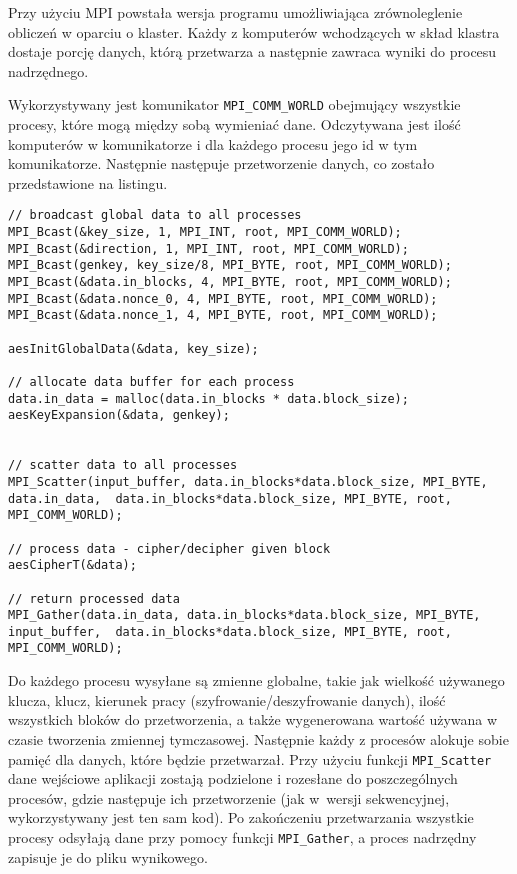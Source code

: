\documentclass[a4paper,12pt]{article}
\begin{document}
Przy użyciu MPI powstała wersja programu umożliwiająca zrównoleglenie obliczeń  
w oparciu o klaster.  Każdy z komputerów wchodzących w skład klastra dostaje 
porcję danych, którą przetwarza a następnie zawraca wyniki do procesu nadrzędnego.

Wykorzystywany jest komunikator \texttt{MPI\_COMM\_WORLD} obejmujący wszystkie procesy, które mogą między sobą wymieniać dane. Odczytywana jest ilość komputerów w komunikatorze i dla każdego procesu jego id w tym komunikatorze. Następnie następuje przetworzenie danych, co zostało przedstawione na listingu.

\begin{lstlisting}
// broadcast global data to all processes
MPI_Bcast(&key_size, 1, MPI_INT, root, MPI_COMM_WORLD);
MPI_Bcast(&direction, 1, MPI_INT, root, MPI_COMM_WORLD);
MPI_Bcast(genkey, key_size/8, MPI_BYTE, root, MPI_COMM_WORLD);
MPI_Bcast(&data.in_blocks, 4, MPI_BYTE, root, MPI_COMM_WORLD);
MPI_Bcast(&data.nonce_0, 4, MPI_BYTE, root, MPI_COMM_WORLD);
MPI_Bcast(&data.nonce_1, 4, MPI_BYTE, root, MPI_COMM_WORLD);

aesInitGlobalData(&data, key_size);

// allocate data buffer for each process
data.in_data = malloc(data.in_blocks * data.block_size);
aesKeyExpansion(&data, genkey);


// scatter data to all processes
MPI_Scatter(input_buffer, data.in_blocks*data.block_size, MPI_BYTE, data.in_data,  data.in_blocks*data.block_size, MPI_BYTE, root, MPI_COMM_WORLD);

// process data - cipher/decipher given block
aesCipherT(&data);

// return processed data
MPI_Gather(data.in_data, data.in_blocks*data.block_size, MPI_BYTE, input_buffer,  data.in_blocks*data.block_size, MPI_BYTE, root, MPI_COMM_WORLD);
\end{lstlisting}

Do każdego procesu wysyłane są zmienne globalne, takie jak wielkość używanego klucza, 
klucz, kierunek pracy (szyfrowanie/deszyfrowanie danych), ilość wszystkich bloków 
do przetworzenia, a także wygenerowana wartość używana w czasie tworzenia zmiennej tymczasowej.
Następnie każdy z procesów alokuje sobie pamięć dla danych, które będzie przetwarzał. 
Przy użyciu funkcji \texttt{MPI\_Scatter} dane wejściowe aplikacji zostają podzielone 
i rozesłane do poszczególnych procesów, gdzie następuje ich przetworzenie (jak 
w~wersji sekwencyjnej, wykorzystywany jest ten sam kod). Po zakończeniu przetwarzania 
wszystkie procesy odsyłają dane przy pomocy funkcji \texttt{MPI\_Gather}, 
a proces nadrzędny zapisuje je do pliku wynikowego.
\end{document}
